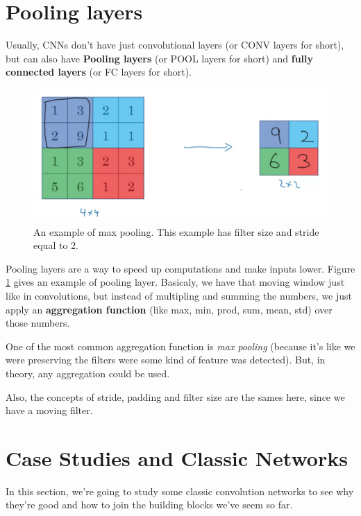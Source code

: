 \documentclass[12pt, a4paper, oneside]{book}
\begin{document}
\section{Pooling layers}%
\label{sec:pooling_layers}

Usually, CNNs don't have just convolutional layers (or CONV layers for short),
but can also have \textbf{Pooling layers} (or POOL layers for short) and
\textbf{fully connected layers} (or FC layers for short).

\begin{figure}[h]
\centering
\includegraphics[scale=0.3]{Res/max-pooling.png}
\caption{An example of max pooling. This example has filter size and stride
equal to $2$.}
\label{max-pooling.png}
\end{figure}

Pooling layers are a way to speed up computations and make inputs lower. Figure
\ref{max-pooling.png} gives an example of pooling layer. Basicaly, we have that
moving window just like in convolutions, but instead of multipling and summing
the numbers, we just apply an \textbf{aggregation function} (like max, min,
prod, sum, mean, std) over those numbers.

One of the most common aggregation function is \textit{max pooling} (because
it's like we were preserving the filters were some kind of feature was
detected). But, in theory, any aggregation could be used.

Also, the concepts of stride, padding and filter size are the sames here, since
we have a moving filter.

\section{Case Studies and Classic Networks}%
\label{sec:case_studies_and_classic_networks}

In this section, we're going to study some classic convolution networks to see
why they're good and how to join the building blocks we've seem so far.
\end{document}
